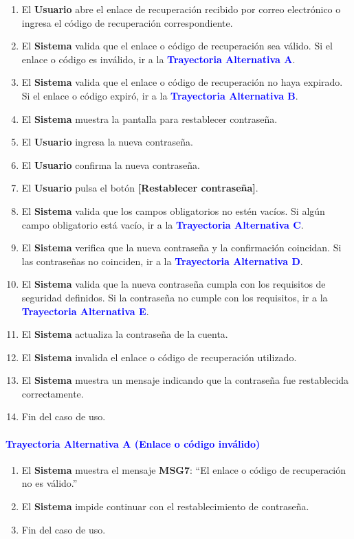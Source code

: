 \begin{enumerate}
    \item El \textbf{Usuario} abre el enlace de recuperación recibido por correo electrónico o ingresa el código de recuperación correspondiente.
    \item El \textbf{Sistema} valida que el enlace o código de recuperación sea válido.
    Si el enlace o código es inválido, ir a la \textbf{\textcolor{blue}{Trayectoria Alternativa A}}.
    \item El \textbf{Sistema} valida que el enlace o código de recuperación no haya expirado.
    Si el enlace o código expiró, ir a la \textbf{\textcolor{blue}{Trayectoria Alternativa B}}.
    \item El \textbf{Sistema} muestra la pantalla para restablecer contraseña.
    \item El \textbf{Usuario} ingresa la nueva contraseña.
    \item El \textbf{Usuario} confirma la nueva contraseña.
    \item El \textbf{Usuario} pulsa el botón \textbf{[Restablecer contraseña]}.
    \item El \textbf{Sistema} valida que los campos obligatorios no estén vacíos.
    Si algún campo obligatorio está vacío, ir a la \textbf{\textcolor{blue}{Trayectoria Alternativa C}}.
    \item El \textbf{Sistema} verifica que la nueva contraseña y la confirmación coincidan.
    Si las contraseñas no coinciden, ir a la \textbf{\textcolor{blue}{Trayectoria Alternativa D}}.
    \item El \textbf{Sistema} valida que la nueva contraseña cumpla con los requisitos de seguridad definidos.
    Si la contraseña no cumple con los requisitos, ir a la \textbf{\textcolor{blue}{Trayectoria Alternativa E}}.
    \item El \textbf{Sistema} actualiza la contraseña de la cuenta.
    \item El \textbf{Sistema} invalida el enlace o código de recuperación utilizado.
    \item El \textbf{Sistema} muestra un mensaje indicando que la contraseña fue restablecida correctamente.
    \item Fin del caso de uso.
\end{enumerate}

\paragraph{\textbf{\textcolor{blue}{Trayectoria Alternativa A (Enlace o código inválido)}}}
\begin{enumerate}
    \item El \textbf{Sistema} muestra el mensaje \textbf{MSG7}: ``El enlace o código de recuperación no es válido.''
    \item El \textbf{Sistema} impide continuar con el restablecimiento de contraseña.
    \item Fin del caso de uso.
\end{enumerate}

